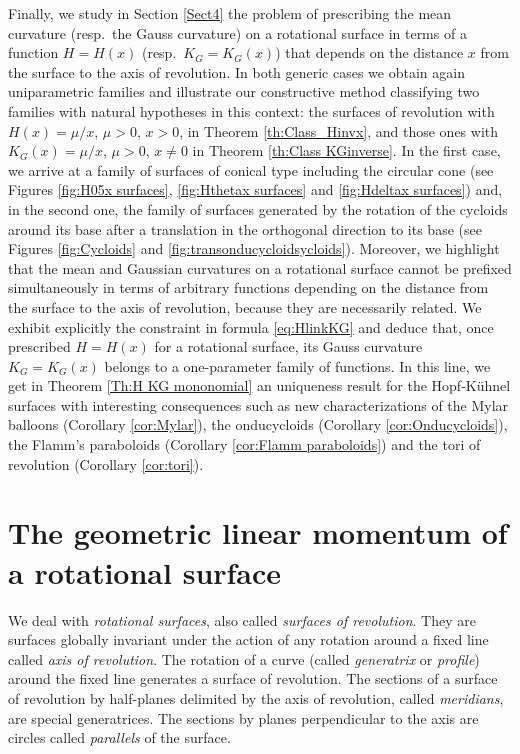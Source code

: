 \documentclass[leqno,11pt]{amsart}
\theoremstyle{definition}
\numberwithin{equation}{section}
\begin{document}
Finally, we study in Section \ref{Sect4} the problem of prescribing the mean curvature (resp.\ the Gauss curvature) on a rotational surface in terms of a function $H=H(x)$ (resp.\ $K_G=K_G(x)$) that depends on the distance $x$ from the surface to the axis of revolution. In both generic cases we obtain again uniparametric families and illustrate our constructive method classifying two families with natural hypotheses in this context:
the surfaces of revolution with $H(x)=\mu/x$, $\mu >0$, $x>0$, in Theorem \ref{th:Class_Hinvx}, and those ones with $K_G(x)=\mu/x$, $\mu >0$, $x\neq 0$ in Theorem \ref{th:Class KGinverse}. In the first case, we arrive at a family of surfaces of conical type including the circular cone (see Figures \ref{fig:H05x surfaces}, \ref{fig:Hthetax surfaces} and \ref{fig:Hdeltax surfaces}) and, in the second one, the family of surfaces  generated by the rotation of the cycloids around its base after a translation in the orthogonal direction to its base (see Figures \ref{fig:Cycloids} and \ref{fig:transonducycloidsycloids}). Moreover, we highlight that the mean and Gaussian curvatures on a rotational surface cannot be prefixed simultaneously in terms of arbitrary functions depending on the distance from the surface to the axis of revolution, because they are necessarily related. We exhibit explicitly the constraint in formula \eqref{eq:HlinkKG} and deduce that, once prescribed $H=H(x)$ for a rotational surface, its Gauss curvature $K_G=K_G(x)$ belongs to a one-parameter family of functions. In this line, we get in Theorem \ref{Th:H KG mononomial} an uniqueness result for the Hopf-Kühnel surfaces with interesting consequences such as new characterizations of the Mylar balloons (Corollary \ref{cor:Mylar}), the onducycloids (Corollary \ref{cor:Onducycloids}), the Flamm's paraboloids (Corollary \ref{cor:Flamm paraboloids}) and the tori of revolution (Corollary \ref{cor:tori}).


 


\section{The geometric linear momentum of a rotational surface}\label{Sect2}

We deal with {\em rotational surfaces}, also called
{\em surfaces of revolution}. They are surfaces globally invariant under the action of any rotation around a fixed line called {\em axis of revolution}.
The rotation of a curve (called {\em generatrix} or {\em profile}) around the fixed line generates a surface of revolution.
The sections of a surface of revolution by half-planes delimited by the axis of revolution, called {\em meridians}, are special generatrices.
The sections by planes perpendicular to the axis are circles called {\em parallels} of the surface.
\end{document}
